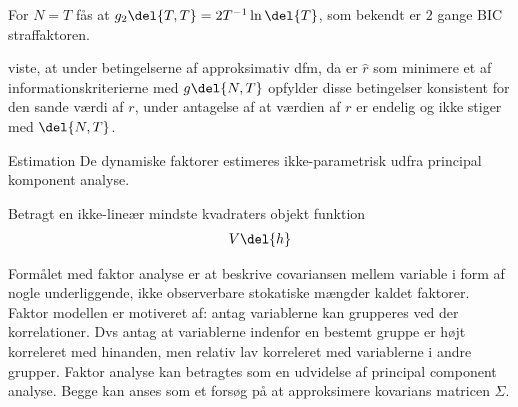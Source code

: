For \(N = T\) fås at \(g_2 \del{T,T} = 2T^{-1} \ln \del{T}\), som bekendt er \(2\) gange BIC straffaktoren.

\citep{Bai_Ng} viste, at under betingelserne af approksimativ dfm, da er \(\hat{r}\) som minimere et af informationskriterierne med \(g \del{N,T}\) opfylder disse betingelser konsistent for den sande værdi af \(r\), under antagelse af at værdien af \(r\) er endelig og ikke stiger med \(\del{N, T}\).



Estimation
De dynamiske faktorer estimeres ikke-parametrisk udfra principal komponent analyse.

Betragt en ikke-lineær mindste kvadraters objekt funktion
\begin{align*}
V \del{h}
\end{align*}









Formålet med faktor analyse er at beskrive covariansen mellem variable i form af nogle underliggende, ikke observerbare stokatiske mængder kaldet faktorer.
Faktor modellen er motiveret af: antag variablerne kan grupperes ved der korrelationer.
Dvs antag at variablerne indenfor en bestemt gruppe er højt korreleret med hinanden, men relativ lav korreleret med variablerne i andre grupper.
Faktor analyse kan betragtes som en udvidelse af principal component analyse.
Begge kan anses som et forsøg på at approksimere kovarians matricen \(\Sigma\).

